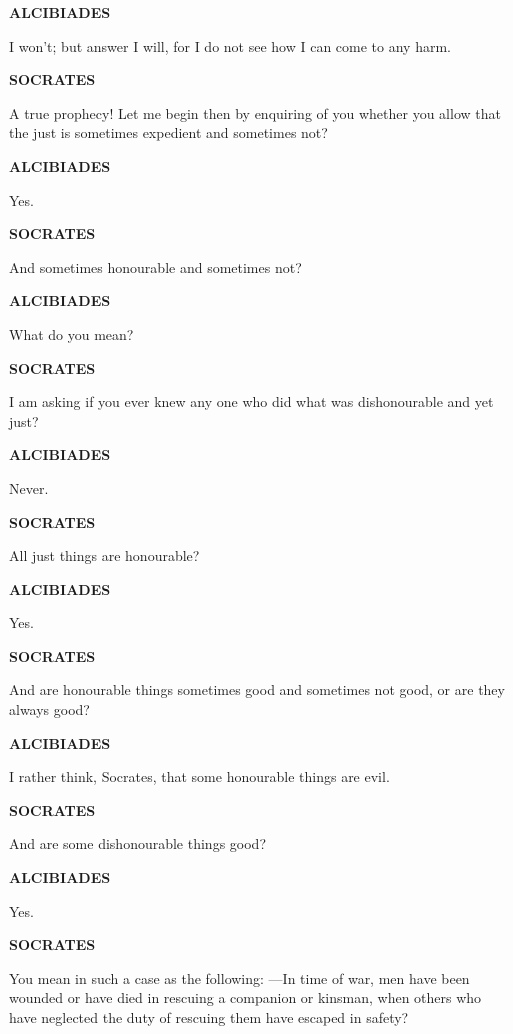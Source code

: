\documentclass[11pt,letter]{article}
\begin{document}
\par \textbf{ALCIBIADES}
\par   I won't; but answer I will, for I do not see how I can come to any harm.

\par \textbf{SOCRATES}
\par   A true prophecy! Let me begin then by enquiring of you whether you allow that the just is sometimes expedient and sometimes not?

\par \textbf{ALCIBIADES}
\par   Yes.

\par \textbf{SOCRATES}
\par   And sometimes honourable and sometimes not?

\par \textbf{ALCIBIADES}
\par   What do you mean?

\par \textbf{SOCRATES}
\par   I am asking if you ever knew any one who did what was dishonourable and yet just?

\par \textbf{ALCIBIADES}
\par   Never.

\par \textbf{SOCRATES}
\par   All just things are honourable?

\par \textbf{ALCIBIADES}
\par   Yes.

\par \textbf{SOCRATES}
\par   And are honourable things sometimes good and sometimes not good, or are they always good?

\par \textbf{ALCIBIADES}
\par   I rather think, Socrates, that some honourable things are evil.

\par \textbf{SOCRATES}
\par   And are some dishonourable things good?

\par \textbf{ALCIBIADES}
\par   Yes.

\par \textbf{SOCRATES}
\par   You mean in such a case as the following: —In time of war, men have been wounded or have died in rescuing a companion or kinsman, when others who have neglected the duty of rescuing them have escaped in safety?
\end{document}

